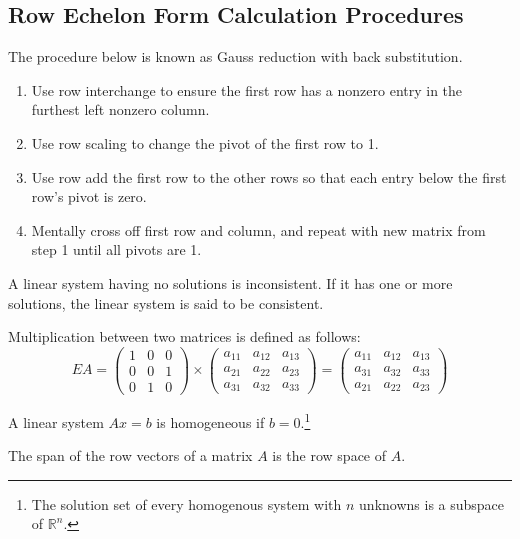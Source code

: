 \documentclass[nobib,notoc]{tufte-handout}
\begin{document}
\subsection{Row Echelon Form Calculation Procedures}
The procedure below is known as Gauss reduction with back substitution.
\begin{enumerate}
	\item Use row interchange to ensure the first row has a nonzero entry in the furthest left nonzero column.
	\item Use row scaling to change the pivot of the first row to 1.
	\item Use row add the first row to the other rows so that each entry below the first row's pivot is zero.
	\item Mentally cross off first row and column, and repeat with new matrix from step 1 until all pivots are 1.
\end{enumerate}
\begin{defi}[Consistency]
	A linear system having no solutions is inconsistent. If it has one or more solutions, the linear system is said to be consistent.
\end{defi}
\begin{defi}
	Multiplication between two matrices is defined as follows:
	\begin{equation*}
		EA=\begin{pmatrix}
			1&0&0\\
			0&0&1\\
			0&1&0
		\end{pmatrix}
		\times
		\begin{pmatrix}
			a_{11}&a_{12}&a_{13}\\
			a_{21}&a_{22}&a_{23}\\
			a_{31}&a_{32}&a_{33}
		\end{pmatrix}=
		\begin{pmatrix}
			a_{11}&a_{12}&a_{13}\\
			a_{31}&a_{32}&a_{33}\\
			a_{21}&a_{22}&a_{23}
		\end{pmatrix}
	\end{equation*}
\end{defi}
\begin{defi}
	A linear system \(Ax=b\) is homogeneous if \(b=0\).\footnote{The solution set of every homogenous system with \(n\) unknowns is a subspace of \(\mathbb{R}^n\).}
\end{defi}
\begin{defi}
	The span of the row vectors of a matrix \(A\) is the row space of \(A\).
\end{defi}
\end{document}
